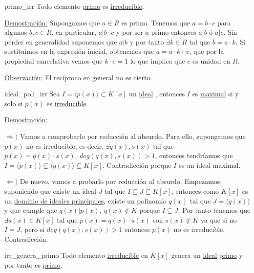 \documentclass[10pt, a4paper]{article}
\newcommand{\obs}{\underline{Observación:} }
\newcommand{\demo}{\underline{Demostración:} }
\newcommand{\ideal}[1][]{\hyperref[def:ideal]{ideal}#1 }
\begin{document}
\begin{proposition}{}{primo_irr}
Todo elemento \hyperref[def:ele_primo]{primo} es \hyperref[def:ele_irr]{irreducible}.
\end{proposition}

\demo Supongamos que $a \in R$ es primo. Tenemos que $a = b \cdot c$ para algunos $b,c \in R$, en particular, $a | b \cdot c$ y por ser $a$ primo entonces $a | b$ ó $a | c$. Sin perder en generalidad suponemos que $a | b$ y por tanto $\exists k \in R$ tal que $b = a \cdot k$. Si sustituimos en la expresión inicial, obtenemos que $a = a \cdot k \cdot \cdot c$, que por la propiedad cancelativa vemos que $k \cdot c = 1$ lo que implica que $c$ es unidad en $R$.

\vspace{3mm}

\obs El recíproco en general no es cierto.

\begin{theorem}{}{ideal_poli_irr}
Sea $I = \langle p(x)\rangle \subset K[x]$ un \ideal, entonces $I$ es \hyperref[def:ideal_maximal]{maximal} si y solo si $p(x)$ es \hyperref[def:ele_irr]{irreducible}.
\end{theorem}

\demo 

$\Longrightarrow )$ Vamos a comprobarlo por reducción al absurdo. Para ello, supongamos que $p(x)$ no es irreducible, es decir, $\exists q(x), s(x)$ tal que $p(x) = q(x) \cdot s(x),\ deg(q(x), s(x)) > 1$, entonces tendríamos que $I = \langle p(x) \rangle \subsetneq \langle q(x) \rangle \subsetneq K[x]$. Contradicción porque $I$ es un ideal maximal.

$\Longleftarrow )$ De nuevo, vamos a probarlo por reducción al absurdo. Empezamos suponiendo que existe un ideal $J$ tal que $I \subsetneq J \subsetneq K[x]$, entonces como $K[x]$ es un \hyperref[def:DIP]{dominio de ideales principales}, existe un polinomio $q(x)$ tal que $J = \langle q(x) \rangle$ y que cumple que $q(x) | p(x),\ q(x) \notin K$ porque $I \subsetneq J$. Por tanto tenemos que $\exists s(x) \in K[x]$ tal que $p(x) = q(x) \cdot s(x)$ con $s(x) \notin K$ ya que si no $I = J$, pero si $deg(q(x), s(x)) > 1$ entonces $p(x)$ no es irreducible. Contradicción.

\begin{corolary}{}{irr_genera_primo}
Todo elemento \hyperref[def:ele_irr]{irreducible} en $K[x]$ genera un \ideal \hyperref[def:ideal_primo]{primo} y por tanto es \hyperref[def:ele_primo]{primo}.
\end{corolary}
\end{document}

